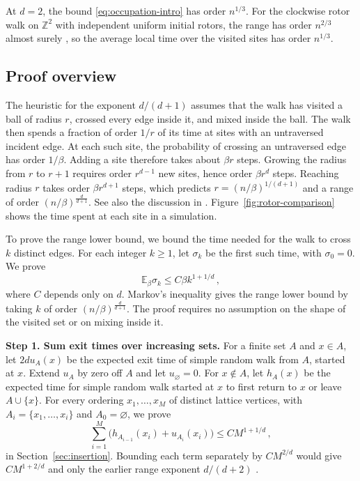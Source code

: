 \documentclass[11pt]{amsart}
\theoremstyle{plain}
\theoremstyle{definition}
\newcommand{\Z}{\mathbb Z}
\newcommand{\E}{\mathbb E}
\begin{document}
	At $d=2$, the bound \eqref{eq:occupation-intro} has order $n^{1/3}$.
	For the clockwise rotor walk on $\Z^2$ with independent uniform initial
	rotors, the range has order $n^{2/3}$ almost surely
	\citep[Theorem~1.1]{BouRabeePeres2026}, so the average local time over
	the visited sites has order $n^{1/3}$.

	\subsection{Proof overview}\label{ssec:proof-overview}

	The heuristic for the exponent $d/(d+1)$ assumes that the walk has
	visited a ball of radius $r$, crossed every edge inside it, and mixed inside
	the ball. The walk then spends a fraction of order $1/r$ of its time at sites
	with an untraversed incident edge. At each such site, the probability
	of crossing an untraversed edge has order $1/\beta$. Adding a site therefore
	takes about $\beta r$ steps. Growing the radius from $r$ to $r+1$ requires
	order $r^{d-1}$ new sites, hence order $\beta r^d$ steps. Reaching radius $r$
	takes order $\beta r^{d+1}$ steps, which predicts
	$r=(n/\beta)^{1/(d+1)}$ and a range of order $(n/\beta)^{\frac{d}{d+1}}$.
    See also the discussion in \citet{Beffara2011}. 
    Figure~\ref{fig:rotor-comparison} shows the time spent at each site in a simulation.


	To prove the range lower bound, we bound the time needed for the walk to cross $k$
	distinct edges. For each integer $k\geq1$, let $\sigma_k$ be the first such time,
	with $\sigma_0=0$.
	We prove
	\[
	\E_\beta\sigma_k\leq C\beta k^{1+1/d}\, ,
	\]
	where $C$ depends only on $d$. Markov's inequality gives the range lower
	bound by taking $k$ of order $(n/\beta)^{\frac{d}{d+1}}$.
	The proof requires no assumption on the shape of the visited set or
	on mixing inside it.

	\medskip
	\noindent\textbf{Step 1. Sum exit times over increasing sets.}
	For a finite set $A$ and $x\in A$, let $2du_A(x)$ be the expected exit time
	of simple random walk from $A$, started at $x$. Extend $u_A$ by zero off
	$A$ and let $u_\varnothing=0$. For $x\notin A$, let $h_A(x)$ be the
	expected time for simple random walk started at $x$ to first return to $x$ or
	leave $A\cup\{x\}$. For every ordering $x_1,\ldots,x_M$ of distinct lattice
	vertices, with $A_i=\{x_1,\ldots,x_i\}$ and $A_0=\varnothing$, we prove
	\begin{equation}\label{eq:overview-insertion}
	\sum_{i=1}^M\bigl(h_{A_{i-1}}(x_i)+u_{A_i}(x_i)\bigr)\leq CM^{1+1/d}\, ,
	\end{equation}
	in Section~\ref{sec:insertion}. Bounding each term separately by
	$CM^{2/d}$ would give $CM^{1+2/d}$ and only the earlier range exponent
	$d/(d+2)$ \citep[Theorem~1.1]{CollevecchioTarres2025}.
\end{document}
